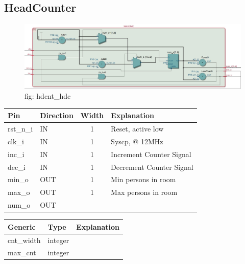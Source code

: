 \documentclass[12pt,a4 paper] {article}
\begin{document}
\subsection{HeadCounter}
\begin{figure}[h]
	\centering	
	\includegraphics[scale=0.3]{../png/hdcnt_hdc.png}
	\newline
	fig: hdcnt\_hdc \\
\end{figure}
\begin{center}
	\begin{tabular}{| p{2cm} | p{2cm} | c| p{4cm} |}
		\hline
		Pin & Direction & Width & Explanation\\
		\hline	
		rst\_n\_i &  IN  & 1 &  Reset, active low \\
		\hline
		clk\_i &   IN  & 1 &          Syscp, @ 12MHz\\
		\hline
		inc\_i  &  IN & 1 &           Increment Counter Signal\\
		\hline
		dec\_i   & IN   & 1 &         Decrement Counter Signal\\
		\hline
		min\_o   & OUT  & 1 &         Min persons in room\\
		\hline
		max\_o   & OUT   & 1 &        Max persons in room\\
		\hline
		num\_o   & OUT &  & \\
		\hline
	\end{tabular}
\end{center}
\begin{center}
	\begin{tabular}{| p{2cm} | p{2cm} | p{4cm} |}
		\hline
		Generic & Type & Explanation \\
		\hline
		cnt\_width  & integer & \\
		\hline
		max\_cnt & integer & \\
		\hline
	\end{tabular}	
\end{center}


\newpage
\end{document}
